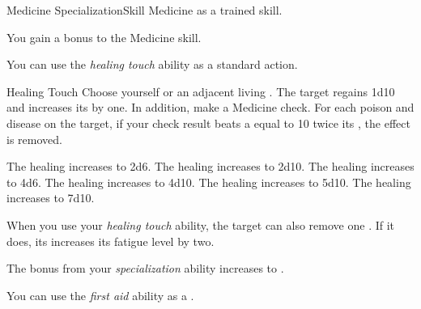     \begin{feat}{Medicine Specialization}{Skill}
        \featpre Medicine as a trained skill.

         You gain a  bonus to the Medicine skill.

         You can use the \textit{healing touch} ability as a standard action.
        \begin{activeability}{Healing Touch}{}
            \rankline
            Choose yourself or an adjacent living .
            The target regains 1d10 \add {}  and increases its  by one.
            In addition, make a Medicine check.
            For each poison and disease on the target, if your check result beats a  equal to 10 \add twice its , the effect is removed.

            \rankline
             The healing increases to 2d6.
             The healing increases to 2d10.
             The healing increases to 4d6.
             The healing increases to 4d10.
             The healing increases to 5d10.
             The healing increases to 7d10.
        \end{activeability}

         When you use your \textit{healing touch} ability, the target can also remove one .
        If it does, its increases its fatigue level by two.

         The bonus from your \textit{specialization} ability increases to .

         You can use the \textit{first aid} ability as a .
    \end{feat}

